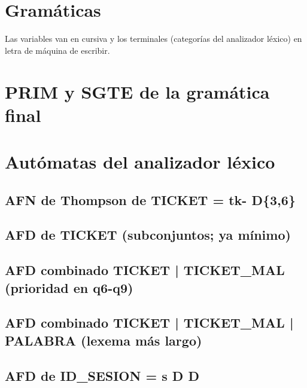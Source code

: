 \documentclass[11pt]{article}
\begin{document}
\section*{Gramáticas}
Las variables van en cursiva y los terminales (categorías del analizador léxico) en letra de máquina de escribir.


\section*{PRIM y SGTE de la gramática final}
{\small }

\section*{Autómatas del analizador léxico}
\subsection*{AFN de Thompson de TICKET = tk- D\{3,6\}}
\begin{center}\resizebox{\linewidth}{!}{}\end{center}

\subsection*{AFD de TICKET (subconjuntos; ya mínimo)}
\begin{center}\resizebox{\linewidth}{!}{}\end{center}

\subsection*{AFD combinado TICKET | TICKET\_MAL (prioridad en q6-q9)}
\begin{center}\resizebox{\linewidth}{!}{}\end{center}

\subsection*{AFD combinado TICKET | TICKET\_MAL | PALABRA (lexema más largo)}
\begin{center}\resizebox{\linewidth}{!}{}\end{center}

\subsection*{AFD de ID\_SESION = s D D}
\begin{center}\resizebox{\linewidth}{!}{}\end{center}
\end{document}
